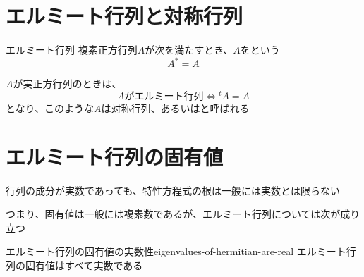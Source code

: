 \documentclass[../../../topic_linear-algebra]{subfiles}
\begin{document}
\sectionline
\section{エルミート行列と対称行列}

\begin{definition*}{エルミート行列}
  複素正方行列$A$が次を満たすとき、$A$をという
  \begin{equation*}
    A^* = A
  \end{equation*}
\end{definition*}

$A$が実正方行列のときは、
\begin{equation*}
  A\text{がエルミート行列} \Longleftrightarrow {}^tA = A
\end{equation*}
となり、このような$A$は\hyperref[def:symmetric-matrix]{対称行列}、あるいはと呼ばれる

\sectionline
\section{エルミート行列の固有値}

行列の成分が実数であっても、特性方程式の根は一般には実数とは限らない

つまり、固有値は一般には複素数であるが、エルミート行列については次が成り立つ

\begin{theorem}{エルミート行列の固有値の実数性}{eigenvalues-of-hermitian-are-real}
  エルミート行列の固有値はすべて実数である
\end{theorem}
\end{document}

